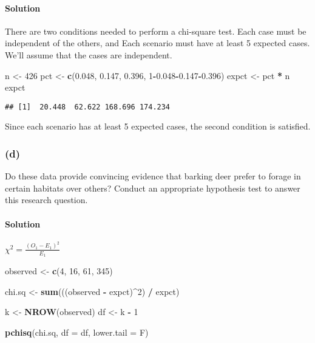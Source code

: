\documentclass[]{article}
\newenvironment{Shaded}{\begin{snugshade}}{\end{snugshade}}
\newcommand{\KeywordTok}[1]{\textcolor[rgb]{0.13,0.29,0.53}{\textbf{#1}}}
\newcommand{\DataTypeTok}[1]{\textcolor[rgb]{0.13,0.29,0.53}{#1}}
\newcommand{\DecValTok}[1]{\textcolor[rgb]{0.00,0.00,0.81}{#1}}
\newcommand{\FloatTok}[1]{\textcolor[rgb]{0.00,0.00,0.81}{#1}}
\newcommand{\StringTok}[1]{\textcolor[rgb]{0.31,0.60,0.02}{#1}}
\newcommand{\OperatorTok}[1]{\textcolor[rgb]{0.81,0.36,0.00}{\textbf{#1}}}
\newcommand{\NormalTok}[1]{#1}
\let\oldparagraph\paragraph
\renewcommand{\paragraph}[1]{\oldparagraph{#1}\mbox{}}
\begin{document}
\paragraph{Solution}\label{solution-12}

There are two conditions needed to perform a chi-square test. Each case
must be independent of the others, and Each scenario must have at least
5 expected cases. We'll assume that the cases are independent.

\begin{Shaded}
\begin{Highlighting}[]
\NormalTok{n <-}\StringTok{ }\DecValTok{426}
\NormalTok{pct <-}\StringTok{ }\KeywordTok{c}\NormalTok{(}\FloatTok{0.048}\NormalTok{, }\FloatTok{0.147}\NormalTok{, }\FloatTok{0.396}\NormalTok{, }\DecValTok{1}\OperatorTok{-}\FloatTok{0.048}\OperatorTok{-}\FloatTok{0.147}\OperatorTok{-}\FloatTok{0.396}\NormalTok{)}
\NormalTok{expct <-}\StringTok{ }\NormalTok{pct }\OperatorTok{*}\StringTok{ }\NormalTok{n}
\NormalTok{expct}
\end{Highlighting}
\end{Shaded}

\begin{verbatim}
## [1]  20.448  62.622 168.696 174.234
\end{verbatim}

Since each scenario has at least 5 expected cases, the second condition
is satisfied.

\subsubsection{(d)}\label{d-2}

Do these data provide convincing evidence that barking deer prefer to
forage in certain habitats over others? Conduct an appropriate
hypothesis test to answer this research question.

\paragraph{Solution}\label{solution-13}

\(\chi^2 = \frac{(O_1 - E_1)^2}{E_1}\)

\begin{Shaded}
\begin{Highlighting}[]
\NormalTok{observed <-}\StringTok{ }\KeywordTok{c}\NormalTok{(}\DecValTok{4}\NormalTok{, }\DecValTok{16}\NormalTok{, }\DecValTok{61}\NormalTok{, }\DecValTok{345}\NormalTok{)}

\NormalTok{chi.sq <-}\StringTok{ }\KeywordTok{sum}\NormalTok{(((observed }\OperatorTok{-}\StringTok{ }\NormalTok{expct)}\OperatorTok{^}\DecValTok{2}\NormalTok{) }\OperatorTok{/}\StringTok{ }\NormalTok{expct)}

\NormalTok{k <-}\StringTok{ }\KeywordTok{NROW}\NormalTok{(observed)}
\NormalTok{df <-}\StringTok{ }\NormalTok{k }\OperatorTok{-}\StringTok{ }\DecValTok{1}

\KeywordTok{pchisq}\NormalTok{(chi.sq, }\DataTypeTok{df =}\NormalTok{ df, }\DataTypeTok{lower.tail =}\NormalTok{ F)}
\end{Highlighting}
\end{Shaded}
\end{document}
